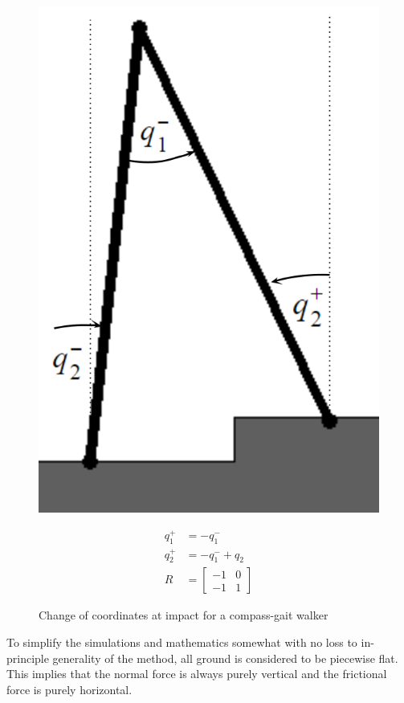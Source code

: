 \begin{figure}[htp]
\centering
\begin{minipage}{0.45\linewidth}
\centering
	\includegraphics[width=0.5\linewidth]{3TechBackground/impact.png}
	\caption{Change of coordinates at impact for a compass-gait walker}
	\label{fig:relabelimpact}
\end{minipage}
\hspace{0.5cm}
\begin{minipage}{0.45\linewidth}
\begin{align*}
	q_1^+ &= -q_1^- \\
	q_2^+ &= -q_1^- + q_2 \\
	R &= \begin{bmatrix}
		-1	& 	0	\\
		-1	&	1
	\end{bmatrix}
\end{align*}
\end{minipage}
\end{figure}

To simplify the simulations and mathematics somewhat with no loss to in-principle generality of the method, all ground is considered to be piecewise flat. This implies that the normal force is always purely vertical and the frictional force is purely horizontal.

